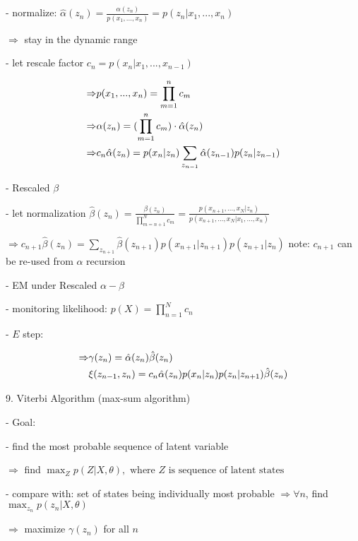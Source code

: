      - normalize: $\displaystyle \hat\alpha(z_n) = \frac{\alpha(z_n)} {p(x_1,...,x_n)} = p(z_n|x_1,...,x_n)$ 

       $\Rightarrow$ stay in the dynamic range

     - let rescale factor $c_n=p(x_n|x_1,...,x_{n-1})$ 

       \begin{align} \displaystyle \Rightarrow \space & p(x_1,...,x_n) = \prod_{m=1}^n c_m \\ \Rightarrow \space & \alpha(z_n) = (\prod_{m=1}^n c_m) \cdot \hat \alpha(z_n) \\ \Rightarrow \space & c_n\hat\alpha(z_n) = p(x_n|z_n)\sum_{z_{n-1}}\hat\alpha(z_{n-1})p(z_n|z_{n-1}) \end{align}

   - Rescaled $\beta$ 

     - let normalization $\displaystyle \hat\beta(z_n) = \frac {\beta(z_n)}{\displaystyle \prod_{m=n+1}^N c_m} = \frac{p(x_{n+1}, ..., x_N|z_n)}{p(x_{n+1}, ..., x_N|x_1,...,x_n)}$ 

       $\displaystyle \Rightarrow c_{n+1} \hat\beta (z_n) = \sum_{z_{n+1}} \hat\beta(z_{n+1}) p(x_{n+1}|z_{n+1})p(z_{n+1}|z_n)$ 
       note: $c_{n+1}$ can be re-used from $\alpha$ recursion

   - EM under Rescaled $\alpha-\beta$ 

     - monitoring likelihood: $\displaystyle p(X) = \prod_{n=1}^Nc_n$ 

     - $E$ step:

       \begin{align}\displaystyle \Rightarrow \space & \gamma(z_n) = \hat\alpha(z_n)\hat\beta(z_n) \\ & \xi(z_{n-1},z_n) = c_n \hat\alpha(z_n)p(x_n|z_n)p(z_n|z_{n+1})\hat\beta(z_n) \end{align}

9. Viterbi Algorithm (max-sum algorithm)

   - Goal:

     - find the most probable sequence of latent variable

       $\Rightarrow$ find $\displaystyle\max_{Z} p(Z|X,\theta), \text{ where $Z$ is sequence of latent states}$ 

     - compare with: set of states being individually most probable $\Rightarrow \forall n$, find $\displaystyle \max_{z_n} p(z_n|X,\theta)$ 

       $\Rightarrow$ maximize $\gamma(z_n)$ for all $n$ 

